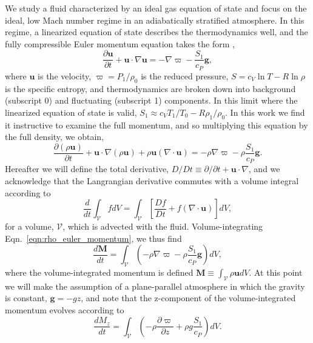\documentclass[twocolumn, amsmath, amsfonts, amssymb, trackchanges]{aastex62}
\newcommand{\DivU}{\ensuremath{\nabla\cdot\bm{u}}}
\newcommand{\grad}{\ensuremath{\nabla}}
\begin{document}
We study a fluid characterized by an ideal gas equation of state and focus on the ideal, low Mach number regime in an adiabatically stratified atmosphere. 
In this regime, a linearized equation of state describes the thermodynamics well, and the fully compressible Euler momentum equation takes the form \citep{brown&all2012},
\begin{equation}
\frac{\partial \bm{u}}{\partial t} + \bm{u}\cdot\grad\bm{u} = 
-\grad\varpi - \frac{S_1}{c_P}\bm{g},
\label{eqn:euler_momentum}
\end{equation}
where $\bm{u}$ is the velocity, $\varpi = P_1 / \rho_0$ is the reduced pressure, $S = c_V\ln T - R\ln\rho$ is the specific entropy, and thermodynamics are broken down into background (subscript 0) and fluctuating (subscript 1) components.
In this limit where the linearized equation of state is valid, $S_1 \approx c_V T_1/T_0 - R \rho_1/\rho_0$.
In this work we find it instructive to examine the full momentum, and so multiplying this equation by the full density, we obtain,
\begin{equation}
\frac{\partial (\rho\bm{u})}{\partial t} + \bm{u}\cdot\grad(\rho\bm{u}) + \rho\bm{u}(\DivU)
= -\rho\grad\varpi - \rho\frac{S_1}{c_P}\bm{g}.
\label{eqn:rho_euler_momentum}
\end{equation}
Hereafter we will define the total derivative, $D/Dt \equiv \partial/\partial t + \bm{u}\cdot\grad$, and we acknowledge that the Langrangian derivative commutes with a volume integral according to 
\begin{equation*}
\frac{d}{dt}\int_{\mathcal{V}} f dV = \int_{\mathcal{V}} \left[\frac{Df}{Dt} + f(\DivU)\right]dV,
\end{equation*}
for a volume, $\mathcal{V}$, which is advected with the fluid.
Volume-integrating Eqn.~\ref{eqn:rho_euler_momentum}, we thus find
\begin{equation}
\frac{d\bm{M}}{dt} = \int_{\mathcal{V}}\left(-\rho\grad\varpi - \rho\frac{S_1}{c_P}\bm{g}\right)dV,
\label{eqn:int_momentum_eqn}
\end{equation}
where the volume-integrated momentum is defined $\bm{M} \equiv \int_{\mathcal{V}}\rho\bm{u} dV$.
At this point we will make the assumption of a plane-parallel atmosphere in which the gravity is constant, $\bm{g} = -g\hat{z}$, and note that the z-component of the volume-integrated momentum evolves according to
\begin{equation}
\frac{d M_z}{dt} = \int_{\mathcal{V}}\left( -\rho\frac{\partial \varpi}{\partial z} + \rho g \frac{S_1}{c_P} \right)dV.
\label{eqn:Mz_definition}
\end{equation}
\end{document}
